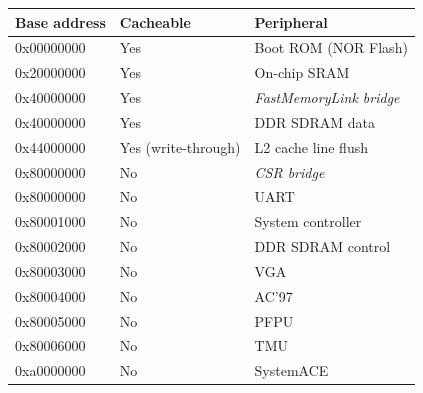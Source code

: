 \documentclass[a4paper,11pt]{article}
\begin{document}
\begin{tabularx}{\textwidth}{|l|l|X|}
\hline
\bf{Base address} & \bf{Cacheable} & \bf{Peripheral} \\
\hline
0x00000000 & Yes & Boot ROM (NOR Flash) \\
\hline
0x20000000 & Yes & On-chip SRAM \\
\hline
0x40000000 & Yes & \textit{FastMemoryLink bridge} \\
\hline
\hspace{5mm} 0x40000000 & Yes & \hspace{5mm} DDR SDRAM data \\
\hline
\hspace{5mm} 0x44000000 & Yes (write-through) & \hspace{5mm} L2 cache line flush \\
\hline
0x80000000 & No & \textit{CSR bridge} \\
\hline
\hspace{5mm} 0x80000000 & No & \hspace{5mm} UART \\
\hline
\hspace{5mm} 0x80001000 & No & \hspace{5mm} System controller \\
\hline
\hspace{5mm} 0x80002000 & No & \hspace{5mm} DDR SDRAM control \\
\hline
\hspace{5mm} 0x80003000 & No & \hspace{5mm} VGA \\
\hline
\hspace{5mm} 0x80004000 & No & \hspace{5mm} AC'97 \\
\hline
\hspace{5mm} 0x80005000 & No & \hspace{5mm} PFPU \\
\hline
\hspace{5mm} 0x80006000 & No & \hspace{5mm} TMU \\
\hline
0xa0000000 & No & SystemACE \\
\hline
\end{tabularx}
\end{document}
